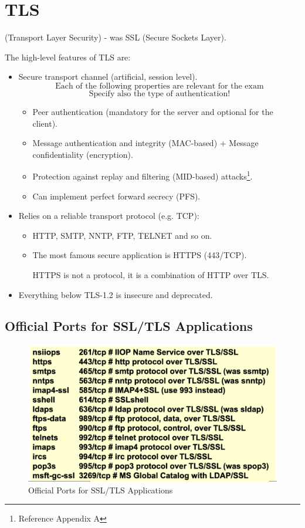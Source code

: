 \section{TLS}
\begin{center}
    (Transport Layer Security) - was SSL (Secure Sockets Layer).
\end{center}
The high-level features of TLS are:
\begin{itemize}
    \item Secure transport channel (artificial, session level).
    \[
        \text{Each of the following properties are relevant for the exam}
    \]
    \[
        \text{Specify also the type of authentication!}
    \]
    \begin{itemize}
        \item Peer authentication (mandatory for the server and optional for the client).
        \item Message authentication and integrity (MAC-based) + Message confidentiality (encryption).
        \item Protection against replay and filtering (MID-based) attacks\footnote{Reference Appendix A}.
        \item Can implement perfect forward secrecy (PFS).
    \end{itemize}
    \item Relies on a reliable transport protocol (e.g. TCP):
    \begin{itemize}
        \item HTTP, SMTP, NNTP, FTP, TELNET and so on.
        \item The most famous secure application is HTTPS (443/TCP).
        \begin{tcolorbox}[colback=red!10!white, colframe=red!70!black, coltitle=white, title=Beware]
            HTTPS is not a protocol, it is a combination of HTTP over TLS.
            \end{tcolorbox}
    \end{itemize}
    \item Everything below TLS-1.2 is insecure and deprecated.
\end{itemize}


\subsection*{Official Ports for SSL/TLS Applications}
\begin{figure}[H]
    \centering
    \includegraphics[width=0.5\linewidth]{Images/Appsec/ssl-tls_prot.png}
    \caption{Official Ports for SSL/TLS Applications}
\end{figure}

